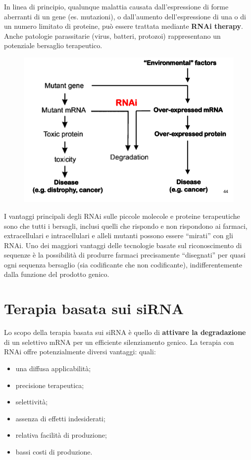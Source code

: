 \documentclass[11pt]{book}
\begin{document}
In linea di principio, qualunque malattia causata dall'espressione di
forme aberranti di un gene (es. mutazioni), o dall'aumento
dell'espressione di una o di un numero limitato di proteine, può essere
trattata mediante \textbf{RNAi therapy}. Anche patologie parassitarie
(virus, batteri, protozoi) rappresentano un potenziale bersaglio
terapeutico.

\begin{figure}[htp]
\centering
\includegraphics[scale=1.00]{img/68_miRNA-therapy.png}
\caption{}
\label{mirna-therapy}
\end{figure}

I vantaggi principali degli RNAi sulle piccole molecole e proteine
terapeutiche sono che tutti i bersagli, inclusi quelli che rispondo e
non rispondono ai farmaci, extracellulari e intracellulari e alleli
mutanti possono essere ``mirati'' con gli RNAi. Uno dei maggiori
vantaggi delle tecnologie basate sul riconoscimento di sequenze è la
possibilità di produrre farmaci precisamente ``disegnati'' per quasi
ogni sequenza bersaglio (sia codificante che non codificante),
indifferentemente dalla funzione del prodotto genico.

\section{Terapia basata sui siRNA}\label{terapia-basata-sui-sirna}

Lo scopo della terapia basata sui siRNA è quello di \textbf{attivare la
degradazione} di un selettivo mRNA per un efficiente silenziamento
genico. La terapia con RNAi offre potenzialmente diversi vantaggi:
quali:

\begin{itemize}
\itemsep1pt\parskip0pt
\item
  una diffusa applicabilità;
\item
  precisione terapeutica;
\item
  selettività;
\item
  assenza di effetti indesiderati;
\item
  relativa facilità di produzione;
\item
  bassi costi di produzione.
\end{itemize}
\end{document}
